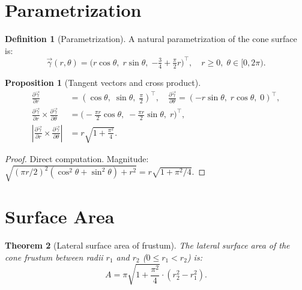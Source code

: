 \documentclass[12pt,a4paper]{article}
\theoremstyle{plain}
\newtheorem{theorem}{Theorem}[section]
\newtheorem{proposition}[theorem]{Proposition}
\theoremstyle{definition}
\newtheorem{definition}{Definition}[section]
\theoremstyle{remark}
\newcommand{\vek}[1]{\vec{#1}}
\begin{document}
\section{Parametrization}

\begin{definition}[Parametrization]\label{def:param}
A natural parametrization of the cone surface is:
\begin{equation}\label{eq:parametrization}
\vek{\gamma}(r,\theta) = \bigl(r\cos\theta,\;r\sin\theta,\;{-\tfrac{3}{4}+\tfrac{\pi}{2}r}\bigr)^\top,
\quad r\geq 0,\;\theta\in[0,2\pi).
\end{equation}
\end{definition}

\begin{proposition}[Tangent vectors and cross product]\label{prop:cross}
\begin{align*}
\frac{\partial\vek{\gamma}}{\partial r} &= (\cos\theta,\;\sin\theta,\;\tfrac{\pi}{2})^\top,\quad
\frac{\partial\vek{\gamma}}{\partial\theta} = (-r\sin\theta,\;r\cos\theta,\;0)^\top,\\
\frac{\partial\vek{\gamma}}{\partial r}\times\frac{\partial\vek{\gamma}}{\partial\theta}
&= \bigl(-\tfrac{\pi r}{2}\cos\theta,\;-\tfrac{\pi r}{2}\sin\theta,\;r\bigr)^\top,\\
\left|\frac{\partial\vek{\gamma}}{\partial r}\times\frac{\partial\vek{\gamma}}{\partial\theta}\right|
&= r\sqrt{1+\frac{\pi^2}{4}}.
\end{align*}
\end{proposition}

\begin{proof}
Direct computation. Magnitude:
$\sqrt{(\pi r/2)^2(\cos^2\theta+\sin^2\theta)+r^2} = r\sqrt{1+\pi^2/4}$.
\end{proof}

\section{Surface Area}

\begin{theorem}[Lateral surface area of frustum]\label{thm:surface_area}
The lateral surface area of the cone frustum between radii $r_1$ and $r_2$
($0\leq r_1<r_2$) is:
\begin{equation}\label{eq:surface_area}
A = \pi\sqrt{1+\frac{\pi^2}{4}}\cdot(r_2^2 - r_1^2).
\end{equation}
\end{theorem}
\end{document}
